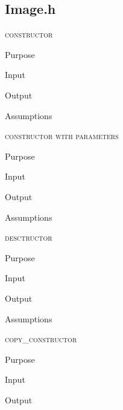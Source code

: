 \documentclass[pdftex, 11pt]{article}
\begin{document}
\subsection{Image.h}
\begin{description}

	\item{\textsc{constructor}}
		\begin{description}
			\item{Purpose}


			\item{Input}


			\item{Output}


			\item{Assumptions}


		\end{description}


	\item{\textsc{constructor with parameters}}
		\begin{description}
			\item{Purpose}


			\item{Input}


			\item{Output}


			\item{Assumptions}


		\end{description}



	\item{\textsc{desctructor}}
		\begin{description}
			\item{Purpose}


			\item{Input}


			\item{Output}


			\item{Assumptions}


		\end{description}


	\item{\textsc{copy\_constructor}}
		\begin{description}
			\item{Purpose}


			\item{Input}


			\item{Output}



\end{description}
\end{description}
\end{document}
